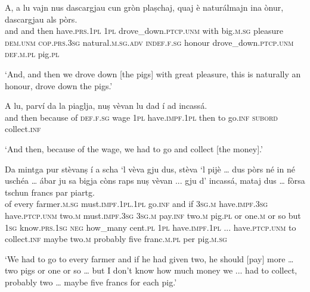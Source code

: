 \begin{linenumbers}
	\gll    A, a lu vajn nus dascargjau cun gròn plaṣchaj, quaj è naturálmajn ina ònur, dascargjau als pòrs.\\
	and and then have.\textsc{prs.1pl} \textsc{1pl} drove\_down.\textsc{ptcp.unm} with  big.\textsc{m.sg} pleasure  \textsc{dem.unm} \textsc{cop.prs.3sg} natural.\textsc{m.sg.adv}  \textsc{indef.f.sg} honour drove\_down.\textsc{ptcp.unm} \textsc{def.m.pl}  pig.\textsc{pl}  \textsc{}  \textsc{}  \textsc{}  \textsc{}  \textsc{} \\
\end{linenumbers}
\medskip
\glt `And, and then we drove down [the pigs] with great pleasure, this is naturally an honour, drove down the pigs.'
\medskip

\begin{linenumbers}
\gll    A lu, parví da la piaglja, nuṣ vèvan lu dad í ad incassá.\\
and then because of \textsc{def.f.sg} wage \textsc{1pl} have.\textsc{impf.1pl} then to go.\textsc{inf}  \textsc{subord}  collect.\textsc{inf} \\
\end{linenumbers}
\medskip
\glt `And then, because of the wage, we had to go and collect [the money].'
\medskip

\begin{linenumbers}
	\gll    Da mintga pur stèvanṣ í a scha `l vèva gju dus, stèva `l pijè …  dus pòrs né in né uschéa … ábar ju sa bigja còns raps nuṣ vèvan\footnotemark{} ... gju d’ incassá, mataj dus … fòrsa tschun francs par piartg.\\
	of every farmer.\textsc{m.sg} must.\textsc{impf.1pl.1pl} go.\textsc{inf} and if \textsc{3sg.m} have.\textsc{impf.3sg} have.\textsc{ptcp.unm} two.\textsc{m} must.\textsc{impf.3sg}  \textsc{3sg.m} pay.\textsc{inf} {} two.\textsc{m} pig.\textsc{pl} or one.\textsc{m} or so {} but  \textsc{1sg}  know.\textsc{prs.1sg}  \textsc{neg} how\_many cent.\textsc{pl} \textsc{1pl} have.\textsc{impf.1pl} ... have.\textsc{ptcp.unm} to collect.\textsc{inf} maybe two.\textsc{m} {} probably five franc.\textsc{m.pl} per pig.\textsc{m.sg}\\
\end{linenumbers}
\medskip
\glt `We had to go to every farmer and if he had given two, he should [pay] more … two pigs or one or so … but I don’t know how much money we ... had to collect, probably two … maybe five francs for each pig.'
\medskip

